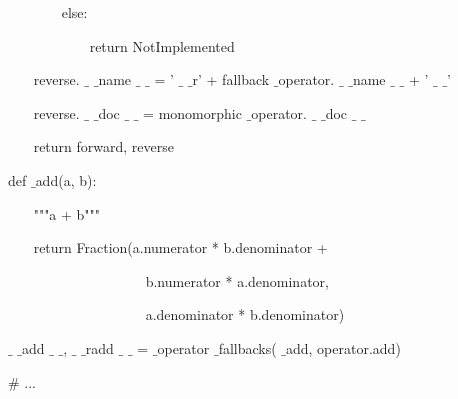 ~~~~~~~ else: \par
~~~~~~~~~~~ return NotImplemented \par
~~~ reverse. $  \_  $ $  \_  $name $  \_  $ $  \_  $ = ' $  \_  $ $  \_  $r' + fallback $  \_  $operator. $  \_  $ $  \_  $name $  \_  $ $  \_  $ + ' $  \_  $ $  \_  $' \par
~~~ reverse. $  \_  $ $  \_  $doc $  \_  $ $  \_  $ = monomorphic $  \_  $operator. $  \_  $ $  \_  $doc $  \_  $ $  \_  $ \par
\vspace{12pt}
~~~ return forward, reverse \par
\vspace{12pt}
def  $  \_  $add(a, b): \par
~~~ """a + b""" \par
~~~ return Fraction(a.numerator * b.denominator + \par
~~~~~~~~~~~~~~~~~~~ b.numerator * a.denominator, \par
~~~~~~~~~~~~~~~~~~~ a.denominator * b.denominator) \par
\vspace{12pt}
 $  \_  $ $  \_  $add $  \_  $ $  \_  $,  $  \_  $ $  \_  $radd $  \_  $ $  \_  $ =  $  \_  $operator $  \_  $fallbacks( $  \_  $add, operator.add) \par
\vspace{12pt}
 $  \#  $ ... \par
\vspace{12pt}

